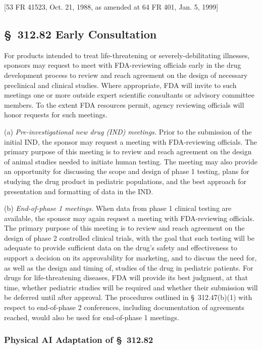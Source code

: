 \documentclass[11pt]{article}
\begin{document}
[53 FR 41523, Oct. 21, 1988, as amended at 64 FR 401, Jan. 5, 1999]

\subsection{\S~312.82 Early Consultation}

For products intended to treat life-threatening or severely-debilitating illnesses, sponsors may request to meet with FDA-reviewing officials early in the drug development process to review and reach agreement on the design of necessary preclinical and clinical studies. Where appropriate, FDA will invite to such meetings one or more outside expert scientific consultants or advisory committee members. To the extent FDA resources permit, agency reviewing officials will honor requests for such meetings.

(a) \textit{Pre-investigational new drug (IND) meetings.} Prior to the submission of the initial IND, the sponsor may request a meeting with FDA-reviewing officials. The primary purpose of this meeting is to review and reach agreement on the design of animal studies needed to initiate human testing. The meeting may also provide an opportunity for discussing the scope and design of phase 1 testing, plans for studying the drug product in pediatric populations, and the best approach for presentation and formatting of data in the IND.

(b) \textit{End-of-phase 1 meetings.} When data from phase 1 clinical testing are available, the sponsor may again request a meeting with FDA-reviewing officials. The primary purpose of this meeting is to review and reach agreement on the design of phase 2 controlled clinical trials, with the goal that such testing will be adequate to provide sufficient data on the drug's safety and effectiveness to support a decision on its approvability for marketing, and to discuss the need for, as well as the design and timing of, studies of the drug in pediatric patients. For drugs for life-threatening diseases, FDA will provide its best judgment, at that time, whether pediatric studies will be required and whether their submission will be deferred until after approval. The procedures outlined in \S~312.47(b)(1) with respect to end-of-phase 2 conferences, including documentation of agreements reached, would also be used for end-of-phase 1 meetings.

\subsubsection{Physical AI Adaptation of \S~312.82}
\end{document}
